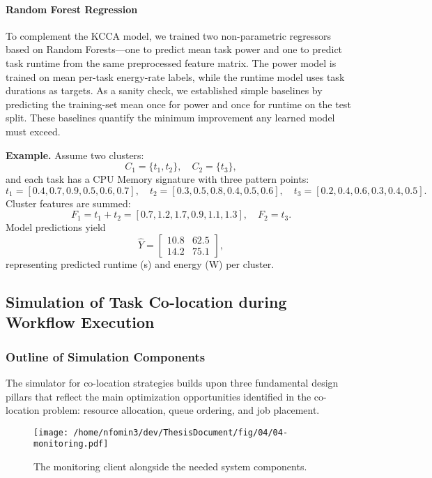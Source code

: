 \paragraph{Random Forest Regression}
To complement the KCCA model, we trained two non-parametric regressors based on Random Forests—one to predict mean task power and one to predict task runtime from the same preprocessed feature matrix. The power model is trained on mean per-task energy-rate labels, while the runtime model uses task durations as targets. As a sanity check, we established simple baselines by predicting the training-set mean once for power and once for runtime on the test split. These baselines quantify the minimum improvement any learned model must exceed.

\textbf{Example.}
Assume two clusters:
\[
    C_1 = \{t_1, t_2\}, \quad C_2 = \{t_3\},
\]
and each task has a CPU Memory signature with three pattern points:
\[
    t_1 = [0.4, 0.7, 0.9, 0.5, 0.6, 0.7], \quad
    t_2 = [0.3, 0.5, 0.8, 0.4, 0.5, 0.6], \quad
    t_3 = [0.2, 0.4, 0.6, 0.3, 0.4, 0.5].
\]
Cluster features are summed:
\[
    F_1 = t_1 + t_2 = [0.7, 1.2, 1.7, 0.9, 1.1, 1.3], \quad
    F_2 = t_3.
\]
Model predictions yield
\[
    \hat{Y} =
    \begin{bmatrix}
        10.8 & 62.5 \\
        14.2 & 75.1
    \end{bmatrix},
\]
representing predicted runtime (s) and energy (W) per cluster.

\subsection{Simulation of Task Co-location during Workflow Execution}
\label{sec:simulation_environment}

\subsubsection{Outline of Simulation Components}
\label{sec:design_pillars}

The simulator for co-location strategies builds upon three fundamental design pillars that reflect the main optimization opportunities identified in the co-location problem: resource allocation, queue ordering, and job placement.

\begin{figure}[htbp]
    \centering
    \texttt{[image: /home/nfomin3/dev/ThesisDocument/fig/04/04-monitoring.pdf]} %
    \caption{The monitoring client alongside the needed system components.}
    \label{fig:monitoring_client}
\end{figure}

